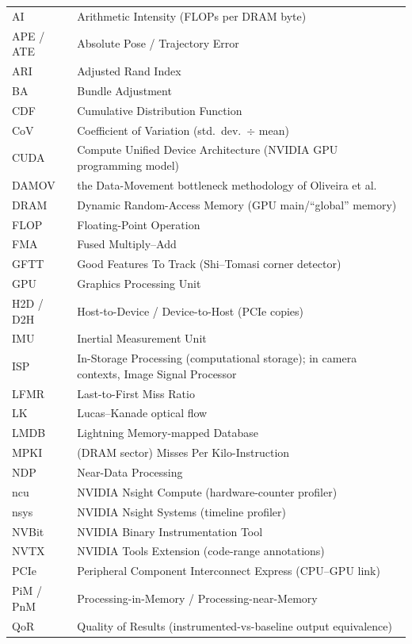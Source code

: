\begin{longtable}{@{}p{}p{}@{}}
AI & Arithmetic Intensity (FLOPs per DRAM byte) \\
APE / ATE & Absolute Pose / Trajectory Error \\
ARI & Adjusted Rand Index \\
BA & Bundle Adjustment \\
CDF & Cumulative Distribution Function \\
CoV & Coefficient of Variation (std.\ dev.\ $\div$ mean) \\
CUDA & Compute Unified Device Architecture (NVIDIA GPU programming model) \\
DAMOV & the Data-Movement bottleneck methodology of Oliveira et al.\ \cite{oliveira2021damov} \\
DRAM & Dynamic Random-Access Memory (GPU main/``global'' memory) \\
FLOP & Floating-Point Operation \\
FMA & Fused Multiply--Add \\
GFTT & Good Features To Track (Shi--Tomasi corner detector) \\
GPU & Graphics Processing Unit \\
H2D / D2H & Host-to-Device / Device-to-Host (PCIe copies) \\
IMU & Inertial Measurement Unit \\
ISP & In-Storage Processing (computational storage); in camera contexts, Image Signal Processor \\
LFMR & Last-to-First Miss Ratio \\
LK & Lucas--Kanade optical flow \\
LMDB & Lightning Memory-mapped Database \\
MPKI & (DRAM sector) Misses Per Kilo-Instruction \\
NDP & Near-Data Processing \\
ncu & NVIDIA Nsight Compute (hardware-counter profiler) \\
nsys & NVIDIA Nsight Systems (timeline profiler) \\
NVBit & NVIDIA Binary Instrumentation Tool \\
NVTX & NVIDIA Tools Extension (code-range annotations) \\
PCIe & Peripheral Component Interconnect Express (CPU--GPU link) \\
PiM / PnM & Processing-in-Memory / Processing-near-Memory \\
QoR & Quality of Results (instrumented-vs-baseline output equivalence) \\

\end{longtable}
